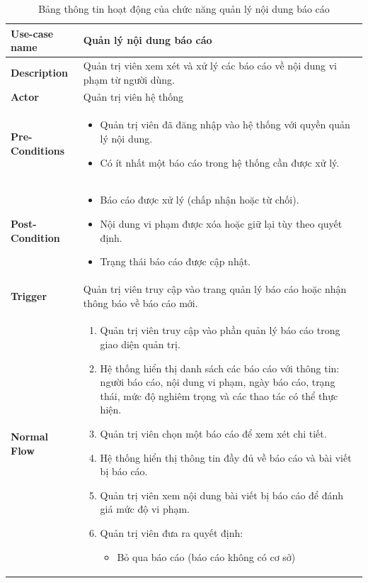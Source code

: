 \begin{longtable}{|>{\bfseries}m{4cm}|m{10cm}|}
    \caption{Bảng thông tin hoạt động của chức năng quản lý nội dung báo cáo}
    \label{table:usecase-manage-report}\\
\hline
Use-case name & Quản lý nội dung báo cáo \\
\hline
Description & Quản trị viên xem xét và xử lý các báo cáo về nội dung vi phạm từ người dùng. \\
\hline
Actor & Quản trị viên hệ thống \\
\hline
Pre-Conditions & 
\begin{itemize}
    \item Quản trị viên đã đăng nhập vào hệ thống với quyền quản lý nội dung.
    \item Có ít nhất một báo cáo trong hệ thống cần được xử lý.
\end{itemize} \\
\hline
Post-Condition & 
\begin{itemize}
    \item Báo cáo được xử lý (chấp nhận hoặc từ chối).
    \item Nội dung vi phạm được xóa hoặc giữ lại tùy theo quyết định.
    \item Trạng thái báo cáo được cập nhật.
\end{itemize} \\
\hline
Trigger & Quản trị viên truy cập vào trang quản lý báo cáo hoặc nhận thông báo về báo cáo mới. \\
\hline
Normal Flow &
\begin{enumerate}
    \item Quản trị viên truy cập vào phần quản lý báo cáo trong giao diện quản trị.
    \item Hệ thống hiển thị danh sách các báo cáo với thông tin: người báo cáo, nội dung vi phạm, ngày báo cáo, trạng thái, mức độ nghiêm trọng và các thao tác có thể thực hiện.
    \item Quản trị viên chọn một báo cáo để xem xét chi tiết.
    \item Hệ thống hiển thị thông tin đầy đủ về báo cáo và bài viết bị báo cáo.
    \item Quản trị viên xem nội dung bài viết bị báo cáo để đánh giá mức độ vi phạm.
    \item Quản trị viên đưa ra quyết định:
       \begin{itemize}
         \item Bỏ qua báo cáo (báo cáo không có cơ sở)

\end{itemize}
\end{enumerate}
\end{longtable}
